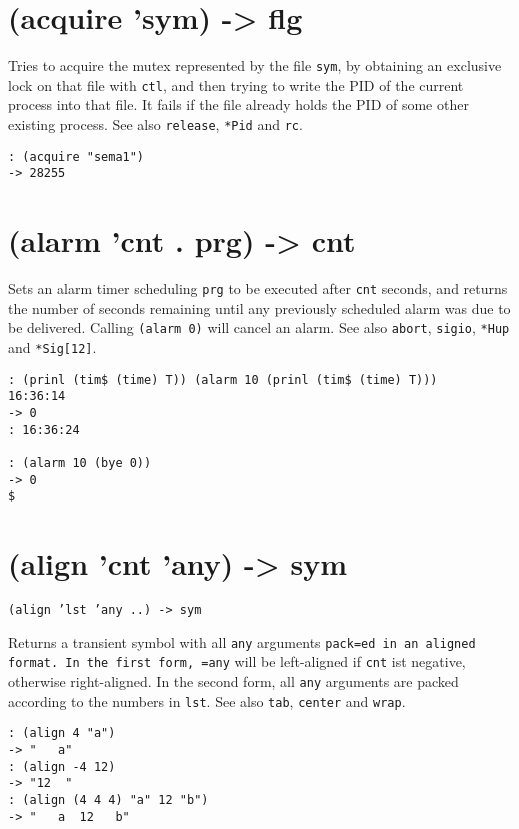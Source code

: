  
\section{(acquire 'sym) -> flg}
\label{sec-8-1-1-11}


Tries to acquire the mutex represented by the file \texttt{sym}, by obtaining
an exclusive lock on that file with \texttt{ctl}, and then trying to write the
PID of the current process into that file. It fails if the file already
holds the PID of some other existing process. See also \texttt{release}, \texttt{*Pid}
and \texttt{rc}.


\begin{verbatim}
: (acquire "sema1")
-> 28255
\end{verbatim}

 
\section{(alarm 'cnt . prg) -> cnt}
\label{sec-8-1-1-12}


Sets an alarm timer scheduling \texttt{prg} to be executed after \texttt{cnt} seconds,
and returns the number of seconds remaining until any previously
scheduled alarm was due to be delivered. Calling \texttt{(alarm 0)} will cancel
an alarm. See also \texttt{abort}, \texttt{sigio}, \texttt{*Hup} and \texttt{*Sig[12]}.


\begin{verbatim}
: (prinl (tim$ (time) T)) (alarm 10 (prinl (tim$ (time) T)))
16:36:14
-> 0
: 16:36:24

: (alarm 10 (bye 0))
-> 0
$
\end{verbatim}

 
\section{(align 'cnt 'any) -> sym}
\label{sec-8-1-1-13}


\texttt{(align 'lst 'any ..) -> sym}

Returns a transient symbol with all \texttt{any} arguments \texttt{pack=ed in an aligned format. In the first form, =any} will be left-aligned if \texttt{cnt}
ist negative, otherwise right-aligned. In the second form, all \texttt{any}
arguments are packed according to the numbers in \texttt{lst}. See also \texttt{tab},
\texttt{center} and \texttt{wrap}.


\begin{verbatim}
: (align 4 "a")
-> "   a"
: (align -4 12)
-> "12  "
: (align (4 4 4) "a" 12 "b")
-> "   a  12   b"
\end{verbatim}

